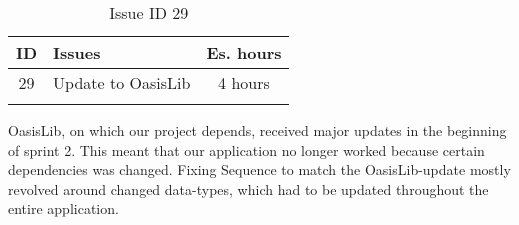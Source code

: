 \begin{longtable} { | c | p{12cm} | c | } 
\hline
	ID 	&	Issues	&		 Es. hours \\\hline
	29 	&	Update to OasisLib	&	4 hours \\\hline
\caption{Issue ID 29}
\label{tab:spr2_oasislib}
\end{longtable}

OasisLib, on which our project depends, received major updates in the beginning of sprint 2. This meant that our application no longer worked because certain dependencies was changed. Fixing Sequence to match the OasisLib-update mostly revolved around changed data-types, which had to be updated throughout the entire application.